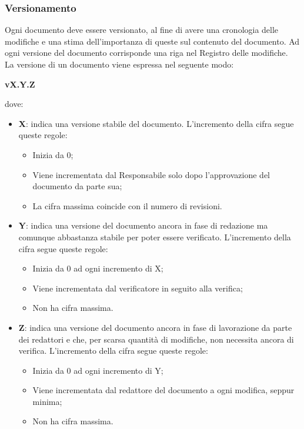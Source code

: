 \documentclass[../norme-di-progetto.tex]{subfiles}
\begin{document}
\subsubsection{Versionamento}
Ogni documento deve essere versionato, al fine di avere una cronologia delle modifiche e una stima dell'importanza di queste sul contenuto del documento. Ad ogni versione del documento corrisponde una riga nel Registro delle modifiche. \\
La versione di un documento viene espressa nel seguente modo: \\ \begin{center}
  \centering
  \textbf{vX.Y.Z}
\end{center} dove:
\begin{itemize}
  \item \textbf{X}: indica una versione stabile del documento. L'incremento della cifra segue queste regole:
  \begin{itemize}
    \item Inizia da 0;
    \item Viene incrementata dal Responsabile solo dopo l'approvazione del documento da parte sua;
    \item La cifra massima coincide con il numero di revisioni.
  \end{itemize}
  \item \textbf{Y}: indica una versione del documento ancora in fase di redazione ma comunque abbastanza stabile per poter essere verificato. L'incremento della cifra segue queste regole:
  \begin{itemize}
    \item Inizia da 0 ad ogni incremento di X;
    \item Viene incrementata dal verificatore in seguito alla verifica;
    \item Non ha cifra massima.
  \end{itemize}
  \item \textbf{Z}: indica una versione del documento ancora in fase di lavorazione da parte dei redattori e che, per scarsa quantità di modifiche, non necessita ancora di verifica. L'incremento della cifra segue queste regole:
  \begin{itemize}
    \item Inizia da 0 ad ogni incremento di Y;
    \item Viene incrementata dal redattore del documento a ogni modifica, seppur minima;
    \item Non ha cifra massima.
  \end{itemize}
\end{itemize}
\end{document}
